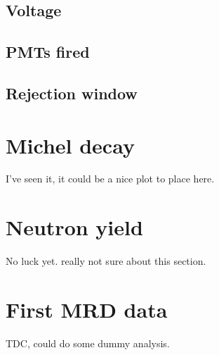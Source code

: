 \subsection{Voltage}
\subsection{PMTs fired}
\subsection{Rejection window}

\section{Michel decay}
I've seen it, it could be a nice plot to place here. 

\section{Neutron yield}
No luck yet.
really not sure about this section.

\section{First MRD data}
TDC, could do some dummy analysis.
